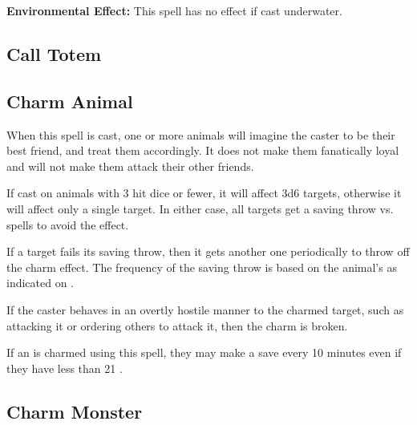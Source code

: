 \begin{multicols*}{2}
\textbf{Environmental Effect:} This spell has no effect if cast underwater.

\subsection{Call Totem}\label{spell:Call Totem}



\subsection{Charm Animal}\label{spell:Charm Animal}

When this spell is cast, one or more animals will imagine the caster to be their best friend, and treat them accordingly. It does not make them fanatically loyal and will not make them attack their other friends.

If cast on animals with 3 hit dice or fewer, it will affect 3d6 targets, otherwise it will affect only a single target. In either case, all targets get a saving throw vs. spells to avoid the effect.

If a target fails its saving throw, then it gets another one periodically to throw off the charm effect. The frequency of the saving throw is based on the animal’s  as indicated on .

If the caster behaves in an overtly hostile manner to the charmed target, such as attacking it or ordering others to attack it, then the charm is broken.

If an  is charmed using this spell, they may make a save every 10 minutes even if they have less than 21 .

\subsection{Charm Monster}\label{spell:Charm Monster}
\end{multicols*}

